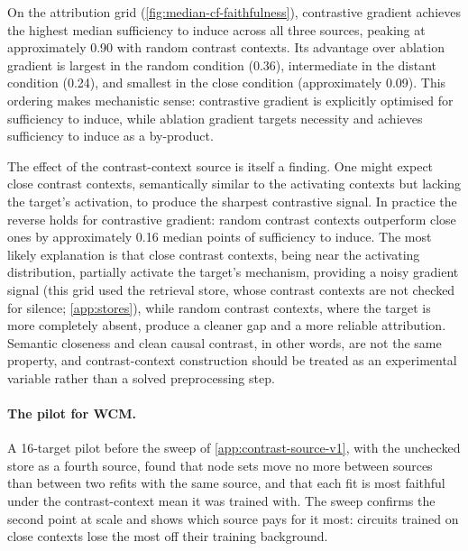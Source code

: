 \documentclass[10pt]{article}
\begin{document}
On the attribution grid (\cref{fig:median-cf-faithfulness}), contrastive gradient achieves the highest median sufficiency to induce across all three sources, peaking at approximately 0.90 with random contrast contexts.
Its advantage over ablation gradient is largest in the random condition (0.36), intermediate in the distant condition (0.24), and smallest in the close condition (approximately 0.09).
This ordering makes mechanistic sense: contrastive gradient is explicitly optimised for sufficiency to induce, while ablation gradient targets necessity and achieves sufficiency to induce as a by-product.

The effect of the contrast-context source is itself a finding.
One might expect close contrast contexts, semantically similar to the activating contexts but lacking the target's activation, to produce the sharpest contrastive signal.
In practice the reverse holds for contrastive gradient: random contrast contexts outperform close ones by approximately 0.16 median points of sufficiency to induce.
The most likely explanation is that close contrast contexts, being near the activating distribution, partially activate the target's mechanism, providing a noisy gradient signal (this grid used the retrieval store, whose contrast contexts are not checked for silence; \cref{app:stores}), while random contrast contexts, where the target is more completely absent, produce a cleaner gap and a more reliable attribution.
Semantic closeness and clean causal contrast, in other words, are not the same property, and contrast-context construction should be treated as an experimental variable rather than a solved preprocessing step.

\paragraph{The pilot for WCM.}
A 16-target pilot before the sweep of \cref{app:contrast-source-v1}, with the unchecked store as a fourth source, found that node sets move no more between sources than between two refits with the same source, and that each fit is most faithful under the contrast-context mean it was trained with.
The sweep confirms the second point at scale and shows which source pays for it most: circuits trained on close contexts lose the most off their training background.
\end{document}
